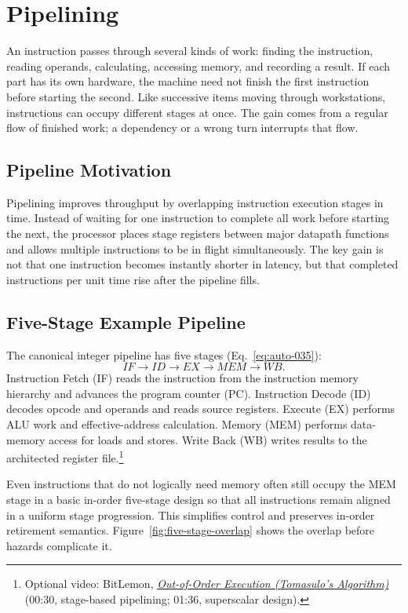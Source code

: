 \chapter{Pipelining}\label{ch:auto-005}

An instruction passes through several kinds of work: finding the instruction, reading operands, calculating, accessing memory, and recording a result.
If each part has its own hardware, the machine need not finish the first instruction before starting the second.
Like successive items moving through workstations, instructions can occupy different stages at once.
The gain comes from a regular flow of finished work; a dependency or a wrong turn interrupts that flow.


\section{Pipeline Motivation}\label{sec:auto-034}
Pipelining improves throughput by overlapping instruction execution stages in time.
Instead of waiting for one instruction to complete all work before starting the next, the processor places stage registers between major datapath functions and allows multiple instructions to be in flight simultaneously.
The key gain is not that one instruction becomes instantly shorter in latency, but that completed instructions per unit time rise after the pipeline fills.


\section{Five-Stage Example Pipeline}\label{sec:auto-035}
The canonical integer pipeline has five stages (Eq.~\eqref{eq:auto-035}):
\begin{equation}\label{eq:auto-035}
    IF \rightarrow ID \rightarrow EX \rightarrow MEM \rightarrow WB.
\end{equation}
Instruction Fetch (IF) reads the instruction from the instruction memory hierarchy and advances the program counter (PC)\@.
Instruction Decode (ID) decodes opcode and operands and reads source registers.
Execute (EX) performs ALU work and effective-address calculation.
Memory (MEM) performs data-memory access for loads and stores.
Write Back (WB) writes results to the architected register file.\footnote{Optional video: BitLemon, \href{https://youtu.be/EzEKGlO9w4Y?t=30}{\emph{Out-of-Order Execution (Tomasulo's Algorithm)}} (00:30, stage-based pipelining; 01:36, superscalar design).}

Even instructions that do not logically need memory often still occupy the MEM stage in a basic in-order five-stage design so that all instructions remain aligned in a uniform stage progression.
This simplifies control and preserves in-order retirement semantics.
Figure~\ref{fig:five-stage-overlap} shows the overlap before hazards complicate it.



